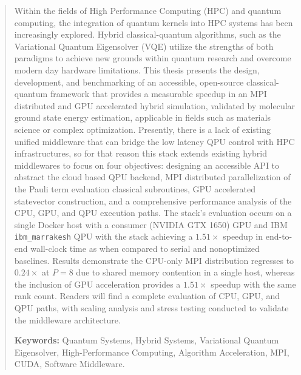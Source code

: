 \begin{abstract} 
Within the fields of High Performance Computing (HPC) and quantum computing, the integration of quantum kernels into HPC
systems has been increasingly explored. Hybrid classical-quantum algorithms, such as the Variational Quantum Eigensolver 
(VQE) utilize the strengths of both paradigms to achieve new grounds within quantum research and overcome modern day hardware limitations. 
This thesis presents the design, development, and benchmarking of an accessible, 
open-source classical-quantum framework that provides a measurable speedup in an MPI distributed and GPU accelerated hybrid simulation, validated by molecular ground state energy estimation,   
applicable in fields such as materials science or complex optimization.
Presently, there is a lack of existing unified middleware that can bridge the low latency QPU control with 
HPC infrastructures, so for that reason this stack extends existing hybrid middlewares to focus on four objectives: designing an 
accessible API to abstract the cloud based QPU backend, MPI distributed parallelization of the Pauli term evaluation classical subroutines, GPU accelerated statevector construction, and a comprehensive performance analysis of the CPU, GPU, and QPU execution paths. The stack's 
evaluation occurs on a single Docker host with a consumer (NVIDIA GTX 1650) GPU and IBM \texttt{ibm\_marrakesh} QPU with the stack achieving a $1.51\times$ speedup in end-to-end wall-clock time 
as when compared to serial and nonoptimized baselines. Results demonstrate the CPU-only MPI distribution regresses to $0.24\times$ at $P=8$ due to shared memory contention in a single host, whereas the 
inclusion of GPU acceleration provides a $1.51\times$ speedup with the same rank count.
Readers will find a complete evaluation of CPU, GPU, and QPU paths, with scaling analysis and stress testing conducted to validate the middleware architecture. 

\textbf{Keywords:} Quantum Systems, Hybrid Systems, Variational Quantum Eigensolver, High-Performance Computing, 
Algorithm Acceleration, MPI, CUDA, Software Middleware.
\end{abstract}

